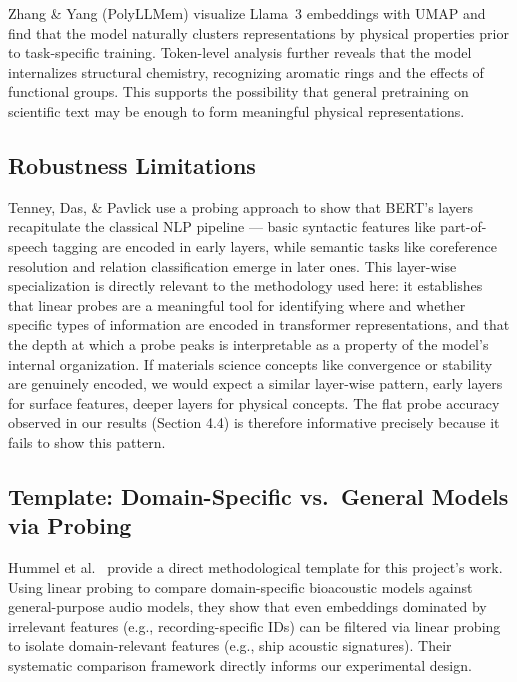 \documentclass[11pt]{article}
\begin{document}
Zhang \& Yang (PolyLLMem) \cite{zhang_yang} visualize Llama~3 embeddings with UMAP and find that the model naturally clusters representations by physical properties prior to task-specific training. Token-level analysis further reveals that the model internalizes structural chemistry, recognizing aromatic rings and the effects of functional groups. This supports the possibility that general pretraining on scientific text may be enough to form meaningful physical representations.

\subsection{Robustness Limitations}

Tenney, Das, \& Pavlick \cite{tenney2019} use a probing approach to show that BERT's layers recapitulate the classical NLP pipeline — basic syntactic features like part-of-speech tagging are encoded in early layers, while semantic tasks like coreference resolution and relation classification emerge in later ones. This layer-wise specialization is directly relevant to the methodology used here: it establishes that linear probes are a meaningful tool for identifying where and whether specific types of information are encoded in transformer representations, and that the depth at which a probe peaks is interpretable as a property of the model's internal organization. If materials science concepts like convergence or stability are genuinely encoded, we would expect a similar layer-wise pattern, early layers for surface features, deeper layers for physical concepts. The flat probe accuracy observed in our results (Section 4.4) is therefore informative precisely because it fails to show this pattern.

\subsection{Template: Domain-Specific vs.\ General Models via Probing}

Hummel et al.\ \cite{hummel2026} provide a direct methodological template for this project's work. Using linear probing to compare domain-specific bioacoustic models against general-purpose audio models, they show that even embeddings dominated by irrelevant features (e.g., recording-specific IDs) can be filtered via linear probing to isolate domain-relevant features (e.g., ship acoustic signatures). Their systematic comparison framework directly informs our experimental design.
\end{document}
